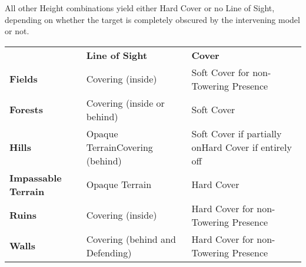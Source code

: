 \renewcommand{\figureLoSCSoftcover}{\largerfontsize{Soft Cover (\minuss{}1 to hit)}}
\renewcommand{\figureLoSCNocover}{\largerfontsize{No Cover}}
\renewcommand{\figureLoSCStandard}{Standard}
\renewcommand{\figureLoSCLarge}{Large}
\renewcommand{\figureLoSCGigantic}{Gigantic}

\begin{center}
\def\svgwidth{0.6\textwidth}

\end{center}

All other Height combinations yield either Hard Cover or no Line of Sight, depending on whether the target is completely obscured by the intervening model or not.

\begin{center}\alternaterowcolors
\begin{tabular}{>{\bfseries}m{3cm}m{4.5cm}m{5cm}}
\hline
 & \textbf{Line of Sight} & \textbf{Cover} \\
Fields & Covering (inside) & Soft Cover for non-Towering Presence \\
Forests & Covering (inside or behind) & Soft Cover \\
Hills & Opaque Terrain\newline Covering (behind) & Soft Cover if partially on\newline Hard Cover if entirely off \\
Impassable Terrain & Opaque Terrain & Hard Cover \\
Ruins & Covering (inside) & Hard Cover for non-Towering Presence \\
Walls & Covering (behind and Defending) & Hard Cover for non-Towering Presence \\
\hline
\end{tabular}\end{center}


\newpage


